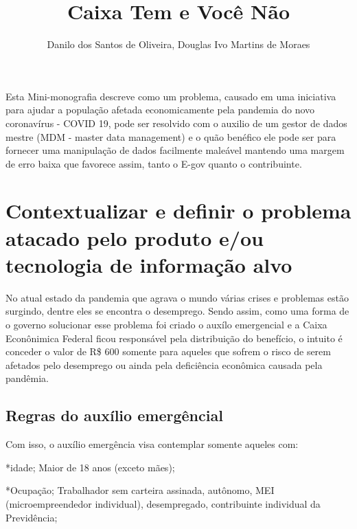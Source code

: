 \documentclass[12pt]{article}
\begin{document}
 
     
\sloppy

\title{Caixa Tem e Você Não}

\author{Danilo dos Santos de Oliveira, Douglas Ivo Martins de Moraes}

\maketitle
 
 
 
 
 
     
\begin{resumo}
  Esta Mini-monografia descreve como um problema, causado em uma iniciativa para ajudar a população afetada economicamente pela pandemia do novo coronavírus - COVID 19, pode ser resolvido com o auxilio de um gestor de dados mestre (MDM - master data management) e o quão benéfico ele pode ser para fornecer uma manipulação de dados facilmente maleável mantendo uma margem de erro baixa que favorece assim, tanto o E-gov quanto o contribuinte.
\end{resumo}


\section{Contextualizar e definir o problema atacado pelo produto e/ou tecnologia de informação alvo} \label{sec:firstpage}

	No atual estado da pandemia que agrava o mundo várias crises e problemas estão surgindo, dentre eles se encontra o desemprego. Sendo assim, como uma forma de o governo solucionar esse problema foi criado o auxílo emergencial e a Caixa Econônimica Federal ficou responsável pela distribuição do benefício, o intuito é conceder o valor de R\$ 600 somente para aqueles que sofrem o risco de serem afetados pelo desemprego ou ainda pela deficiência econômica causada pela pandêmia.

\subsection{Regras do auxílio emergêncial}	
Com isso, o auxílio emergência visa contemplar somente aqueles com:                                 

*idade; Maior de 18 anos (exceto mães);

*Ocupação; Trabalhador sem carteira assinada, autônomo, MEI (microempreendedor individual), desempregado, contribuinte individual da Previdência;
\end{document}
